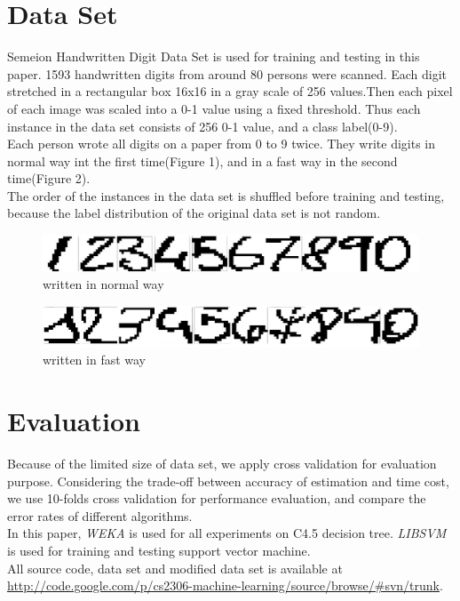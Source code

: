 \documentclass[a4paper,11pt]{nurop}
\begin{document}
\section{Data Set}
Semeion Handwritten Digit Data Set\cite{semeion} is used for training and testing in this paper. 1593 handwritten digits from around 80 persons were scanned. Each digit stretched in a rectangular box 16x16 in a gray scale of 256 values.Then each pixel of each image was scaled into a 0-1 value using a fixed threshold. Thus each instance in the data set consists of 256 0-1 value, and a class label(0-9).\\
Each person wrote all digits on a paper from 0 to 9 twice. They write digits in normal way int the first time(Figure 1), and in a fast way in the second time(Figure 2).\\
The order of the instances in the data set is shuffled before training and testing, because the label distribution of the original data set is not random.
\begin{figure}
\centering
\includegraphics[width=1.0\textwidth]{clear}
\caption{written in normal way}
\end{figure}

\begin{figure}
\centering
\includegraphics[width=1.0\textwidth]{unclear}
\caption{written in fast way}
\end{figure}

\section{Evaluation}

Because of the limited size of data set, we apply cross validation for evaluation purpose. Considering the trade-off between accuracy of estimation and time cost, we use 10-folds cross validation for performance evaluation, and compare the error rates of different algorithms.\\
In this paper, \emph{WEKA}\cite{weka} is used for all experiments on C4.5 decision tree. \emph{LIBSVM}\cite{libsvm} is used for training and testing support vector machine.\\
All source code, data set and modified data set is available at \url{http://code.google.com/p/cs2306-machine-learning/source/browse/#svn/trunk}.
\end{document}
